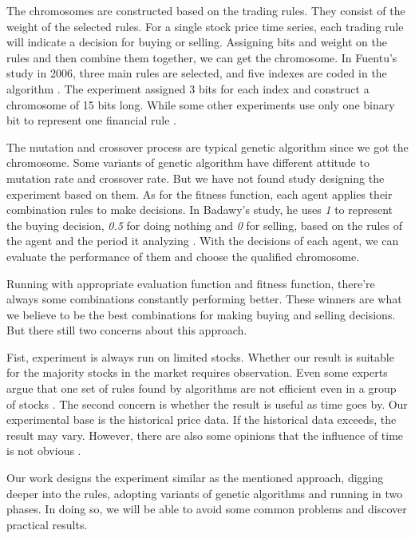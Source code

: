 \documentclass{article}
\begin{document}
The chromosomes are constructed based on the trading rules.
They consist of the weight of the selected rules.
For a single stock price time series, each trading rule will indicate a decision for buying or selling.
Assigning bits and weight on the rules and then combine them together, we can get the chromosome.
In Fuentu's study in 2006, three main rules are selected, and five indexes are coded in the algorithm
\cite{genetic-algorithms-to-optimise-the-time-to-make-stock-market-investment}.
The experiment assigned 3 bits for each index and construct a chromosome of 15 bits long.
While some other experiments use only one binary bit to represent one financial rule
\cite{stock-timing-using-genetic-algorithms}.

The mutation and crossover process are typical genetic algorithm since we got the chromosome.
Some variants of genetic algorithm have different attitude to mutation rate and crossover rate.
But we have not found study designing the experiment based on them.
As for the fitness function, each agent applies their combination rules to make decisions.
In Badawy's study, he uses \emph{1} to represent the buying decision, \emph{0.5} for doing nothing and \emph{0} for selling,
based on the rules of the agent and the period it analyzing
\cite{genetic-algorithms-for-predicting-the-egyptian-stock-market}.
With the decisions of each agent, we can evaluate the performance of them and choose the qualified chromosome.

Running with appropriate evaluation function and fitness function,
there're always some combinations constantly performing better.
These winners are what we believe to be the best combinations for making buying and selling decisions.
But there still two concerns about this approach.

Fist, experiment is always run on limited stocks.
Whether our result is suitable for the majority stocks in the market requires observation.
Even some experts argue that one set of rules found by algorithms are not efficient even in a group of stocks
\cite{stock-timing-using-genetic-algorithms}.
The second concern is whether the result is useful as time goes by.
Our experimental base is the historical price data.
If the historical data exceeds, the result may vary.
However, there are also some opinions that the influence of time is not obvious
\cite{stock-timing-using-genetic-algorithms}.

Our work designs the experiment similar as the mentioned approach,
digging deeper into the rules, adopting variants of genetic algorithms and running in two phases.
In doing so, we will be able to avoid some common problems and discover practical results.






\end{document}
